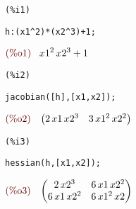 \noindent
\begin{minipage}[t]{8ex}
\color{red}\bf
\begin{verbatim}
(%i1) 
\end{verbatim}
\end{minipage}
\begin{minipage}[t]{\textwidth}
\color{blue}
\begin{verbatim}
h:(x1^2)*(x2^3)+1;
\end{verbatim}
\end{minipage}
\begin{math}\displaystyle
\parbox{8ex}{\color{labelcolor}(\%o1) }
{x1}^{2}\,{x2}^{3}+1
\end{math}


\noindent
\begin{minipage}[t]{8ex}
\color{red}\bf
\begin{verbatim}
(%i2) 
\end{verbatim}
\end{minipage}
\begin{minipage}[t]{\textwidth}
\color{blue}
\begin{verbatim}
jacobian([h],[x1,x2]);
\end{verbatim}
\end{minipage}
\begin{math}\displaystyle
\parbox{8ex}{\color{labelcolor}(\%o2) }
\begin{pmatrix}2\,x1\,{x2}^{3} & 3\,{x1}^{2}\,{x2}^{2}\end{pmatrix}
\end{math}


\noindent
\begin{minipage}[t]{8ex}
\color{red}\bf
\begin{verbatim}
(%i3) 
\end{verbatim}
\end{minipage}
\begin{minipage}[t]{\textwidth}
\color{blue}
\begin{verbatim}
hessian(h,[x1,x2]);
\end{verbatim}
\end{minipage}
\begin{math}\displaystyle
\parbox{8ex}{\color{labelcolor}(\%o3) }
\begin{pmatrix}2\,{x2}^{3} & 6\,x1\,{x2}^{2}\cr 6\,x1\,{x2}^{2} & 6\,{x1}^{2}\,x2\end{pmatrix}
\end{math}

